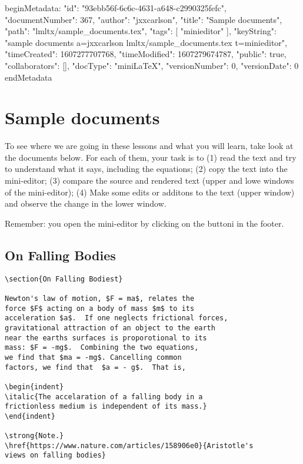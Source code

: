 beginMetadata:
{
    "id": "93ebb56f-6c6c-4631-a648-c2990325fefc",
    "documentNumber": 367,
    "author": "jxxcarlson",
    "title": "Sample documents",
    "path": "lmltx/sample_documents.tex",
    "tags": [
        "minieditor"
    ],
    "keyString": "sample documents a=jxxcarlson lmltx/sample_documents.tex t=minieditor",
    "timeCreated": 1607277707768,
    "timeModified": 1607279674787,
    "public": true,
    "collaborators": [],
    "docType": "miniLaTeX",
    "versionNumber": 0,
    "versionDate": 0
}
endMetadata

\section{Sample documents}

\innertableofcontents

To see where we are going in these lessons and what you will learn, take look at the 
documents below.  For each of them, your task is to (1)  read the text and try to understand what it says, including the equations; (2) copy the text into the mini-editor; (3) compare the source and rendered text (upper and lowe windows of the mini-editor); (4) Make some edits or additons to the text (upper window) and observe the change in the lower window.

Remember: you open the mini-editor by clicking on the  buttoni in the footer.

\subsection{On Falling Bodies}

\begin{verbatim}
\section{On Falling Bodiest}

Newton's law of motion, $F = ma$, relates the 
force $F$ acting on a body of mass $m$ to its 
acceleration $a$.  If one neglects frictional forces, 
gravitational attraction of an object to the earth 
near the earths surfaces is proporotional to its 
mass: $F = -mg$.  Combining the two equations, 
we find that $ma = -mg$. Cancelling common 
factors, we find that  $a = - g$.  That is, 

\begin{indent}
\italic{The accelaration of a falling body in a 
frictionless medium is independent of its mass.}
\end{indent}

\strong{Note.} 
\href{https://www.nature.com/articles/158906e0}{Aristotle's 
views on falling bodies}
\end{verbatim}

